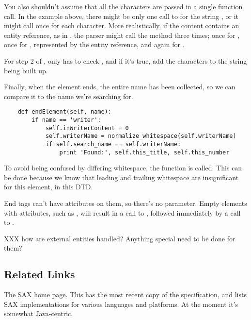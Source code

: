 \documentclass{howto}
\newcommand{\element}[1]{\code{#1}}
\begin{document}
You also shouldn't assume that all the characters are passed in a
single function call.  In the example above, there might be only one
call to  for the string , or
it might call  once for each character.  More
realistically, if the content contains an entity reference, as in
, the parser might call the method three times; once for 
, once for \samp{\&}, represented by the entity
reference, and again for .

For step 2 of ,  only has to
check , and if it's true, add the characters to
the string being built up.

Finally, when the \element{writer} element ends, the entire name has
been collected, so we can compare it to the name we're searching for.

\begin{verbatim}
    def endElement(self, name):
        if name == 'writer':
            self.inWriterContent = 0
            self.writerName = normalize_whitespace(self.writerName)
            if self.search_name == self.writerName:
                print 'Found:', self.this_title, self.this_number
\end{verbatim}

To avoid being confused by differing whitespace, the
 function is called.  This can be
done because we know that leading and trailing whitespace are
insignificant for this element, in this DTD.  

End tags can't have attributes on them, so there's no 
parameter.  Empty elements with attributes, such as , will result in a call to
, followed immediately by a call to .

XXX how are external entities handled?  Anything special need to be
done for them?

\subsection{Related Links}

\begin{definitions}
%
The SAX home page.  This has the most recent copy of the
specification, and lists SAX implementations for various languages and
platforms.  At the moment it's somewhat Java-centric.

\end{definitions}
\end{document}
